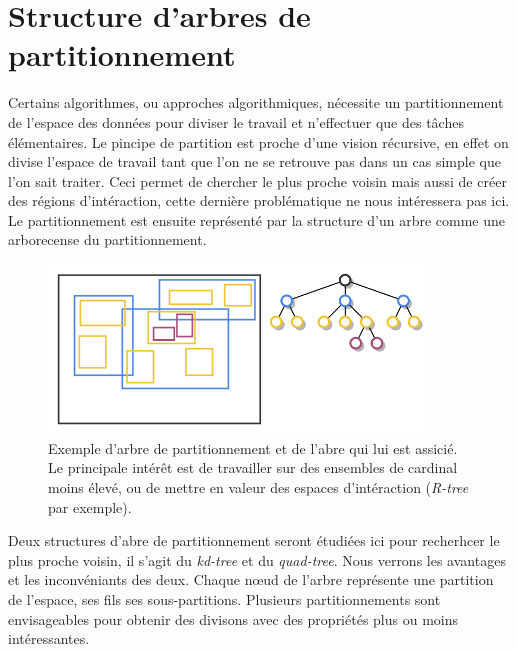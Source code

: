 \section[Arbres de partitionnement]{Structure d'arbres de partitionnement}

Certains algorithmes, ou approches algorithmiques, nécessite un partitionnement de l'espace des données pour diviser le travail et n'effectuer que des tâches élémentaires. Le pincipe de partition est proche d'une vision récursive, en effet on divise l'espace de travail tant que l'on ne se retrouve pas dans un cas simple que l'on sait traiter. Ceci permet de chercher le plus proche voisin mais aussi de créer des régions d'intéraction, cette dernière problématique ne nous intéressera pas ici. Le partitionnement est ensuite représenté par la structure d'un arbre comme une arborecense du partitionnement.

	\begin{figure}[h]
		\centering
		\includegraphics[width=0.9\textwidth]{img/rtree.png}
		\caption[Exemple de partitionnement et d'arbre associé]{Exemple d'arbre de partitionnement et de l'abre qui lui est assicié. Le principale intérêt est de travailler sur des ensembles de cardinal moins élevé, ou de mettre en valeur des espaces d'intéraction (\emph{R-tree} par exemple).}
	\end{figure}

Deux structures d'abre de partitionnement seront étudiées ici pour recherhcer le plus proche voisin, il s'agit du \emph{kd-tree} et du \emph{quad-tree}. Nous verrons les avantages et les inconvéniants des deux. Chaque n\oe{}ud de l'arbre représente une partition de l'espace, ses fils ses sous-partitions. Plusieurs partitionnements sont envisageables pour obtenir des divisons avec des propriétés plus ou moins intéressantes.


